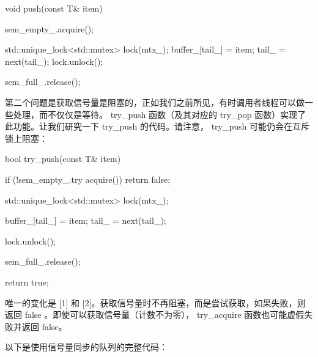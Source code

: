 \begin{cpp}
void push(const T& item)
{
    sem_empty_.acquire();

    std::unique_lock<std::mutex> lock(mtx_);
    buffer_[tail_] = item;
    tail_ = next(tail_);
    lock.unlock();

    sem_full_.release();
}
\end{cpp}

第二个问题是获取信号量是阻塞的，正如我们之前所见，有时调用者线程可以做一些处理，而不仅仅是等待。 try\_push 函数（及其对应的 try\_pop 函数）实现了此功能。让我们研究一下 try\_push 的代码。请注意， try\_push 可能仍会在互斥锁上阻塞：

\begin{cpp}
bool try_push(const T& item) {
    if (!sem_empty_.try acquire()) {
        return false;
    }

    std::unique_lock<std::mutex> lock(mtx_);

    buffer_[tail_] = item;
    tail_ = next(tail_);

    lock.unlock();

    sem_full_.release();

    return true;
}
\end{cpp}

唯一的变化是 [1] 和 [2]。获取信号量时不再阻塞，而是尝试获取，如果失败，则返回 false 。即使可以获取信号量（计数不为零）， try\_acquire 函数也可能虚假失败并返回 false。

以下是使用信号量同步的队列的完整代码：

